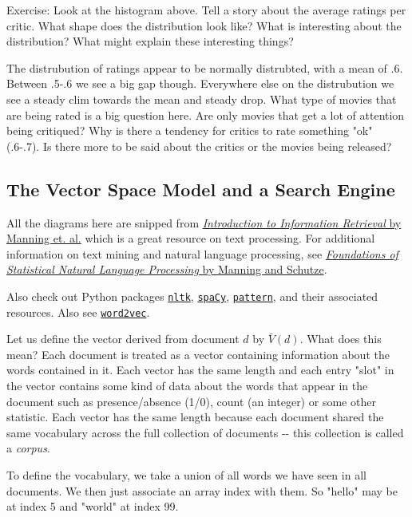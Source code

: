 \documentclass[11pt]{article}
\begin{document}
 Exercise: Look at the histogram above. Tell a story about the average
ratings per critic. What shape does the distribution look like? What is
interesting about the distribution? What might explain these interesting
things?

The distrubution of ratings appear to be normally distrubted, with a
mean of .6. Between .5-.6 we see a big gap though. Everywhere else on
the distrubution we see a steady clim towards the mean and steady drop.
What type of movies that are being rated is a big question here. Are
only movies that get a lot of attention being critiqued? Why is there a
tendency for critics to rate something "ok" (.6-.7). Is there more to be
said about the critics or the movies being released?

    \subsection{The Vector Space Model and a Search
Engine}\label{the-vector-space-model-and-a-search-engine}

    All the diagrams here are snipped from
\href{http://nlp.stanford.edu/IR-book/}{\emph{Introduction to
Information Retrieval} by Manning et. al.} which is a great resource on
text processing. For additional information on text mining and natural
language processing, see
\href{http://nlp.stanford.edu/fsnlp/}{\emph{Foundations of Statistical
Natural Language Processing} by Manning and Schutze}.

Also check out Python packages
\href{http://www.nltk.org/}{\texttt{nltk}},
\href{https://spacy.io/}{\texttt{spaCy}},
\href{http://www.clips.ua.ac.be/pattern}{\texttt{pattern}}, and their
associated resources. Also see
\href{https://en.wikipedia.org/wiki/Word2vec}{\texttt{word2vec}}.

Let us define the vector derived from document \(d\) by \(\bar V(d)\).
What does this mean? Each document is treated as a vector containing
information about the words contained in it. Each vector has the same
length and each entry "slot" in the vector contains some kind of data
about the words that appear in the document such as presence/absence
(1/0), count (an integer) or some other statistic. Each vector has the
same length because each document shared the same vocabulary across the
full collection of documents -\/- this collection is called a
\emph{corpus}.

To define the vocabulary, we take a union of all words we have seen in
all documents. We then just associate an array index with them. So
"hello" may be at index 5 and "world" at index 99.
\end{document}

